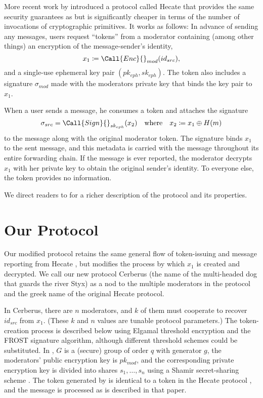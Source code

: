 \documentclass[conference]{IEEEtran}
\newcommand{\Enc}{\Call{Enc}{}}
\newcommand{\Sign}{\Call{Sign}{}}
\newcommand{\ceq}{\coloneqq}
\begin{document}
More recent work by \textcite{hecate} introduced a protocol called Hecate that provides the same security guarantees as \textcite{tglmr} but is significantly cheaper in terms of the number of invocations of cryptographic primitives.
It works as follows:
In advance of sending any messages, users request ``tokens'' from a moderator containing (among other things) an encryption of the message-sender's identity,
\begin{equation}
	x_1 \ceq \Enc_{mod}(id_{src}),
\end{equation}
and a single-use ephemeral key pair $(pk_{eph}, sk_{eph})$.
The token also includes a signature $\sigma_{mod}$ made with the moderators private key that binds the key pair to $x_1$.

When a user sends a message, he consumes a token and attaches the signature
\begin{equation}
	\sigma_{src} = \Sign_{sk_{eph}}(x_2)
	\quad \text{where} \quad
	x_2 \ceq x_1 \oplus H(m)
\end{equation}
to the message along with the original moderator token.
The signature binds $x_1$ to the sent message, and this metadata is carried with the message throughout its entire forwarding chain.
If the message is ever reported, the moderator decrypts $x_1$ with her private key to obtain the original sender's identity.
To everyone else, the token provides no information.

We direct readers to \textcite{hecate} for a richer description of the protocol and its properties.

\section{Our Protocol}

Our modified protocol retains the same general flow of token-issuing and message reporting from Hecate \cite{hecate}, but modifies the process by which $x_1$ is created and decrypted.
We call our new protocol Cerberus (the name of the multi-headed dog that guards the river Styx) as a nod to the multiple moderators in the protocol and the greek name of the original Hecate protocol.

In Cerberus, there are $n$ moderators, and $k$ of them must cooperate to recover $id_{src}$ from $x_1$.
(These $k$ and $n$ values are tunable protocol parameters.)
The token-creation process is described below using Elgamal threshold encryption and the FROST \cite{frost} signature algorithm, although different threshold schemes could be substituted. In , $G$ is a (secure) group of order $q$ with generator $g$, the moderators' public encryption key is $pk_{mod}$, and the corresponding private encryption key is divided into shares $s_1, \ldots, s_n$ using a Shamir secret-sharing scheme \cite{shamir-secret-sharing}.
The token generated by  is identical to a token in the Hecate protocol \cite{hecate}, and the message is processed as is described in that paper.
\end{document}
